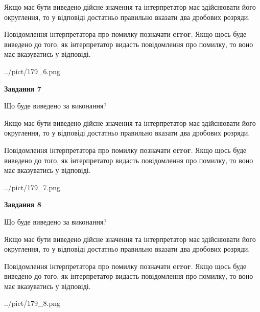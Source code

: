 \documentclass[12pt, ukrainian]{article}
\begin{document}
{\begin {Large}
Якщо має бути виведено дійсне значення та інтерпретатор має здійснювати його округлення, 
то у відповіді достатньо правильно вказати два дробових розряди.

Повідомлення інтерпретатора про помилку позначати \textbf{error}.
Якщо щось буде виведено до того, як інтерпретатор видасть повідомлення про помилку, 
то воно має вказуватись у відповіді. \par

\begin{center}
	{../pict/179_6.png}
\end{center}
\newpage

{\begin {center}\textbf{Завдання 7}\end {center}}\par
Що буде виведено за виконання? \par

Якщо має бути виведено дійсне значення та інтерпретатор має здійснювати його округлення, 
то у відповіді достатньо правильно вказати два дробових розряди.

Повідомлення інтерпретатора про помилку позначати \textbf{error}.
Якщо щось буде виведено до того, як інтерпретатор видасть повідомлення про помилку, 
то воно має вказуватись у відповіді. \par

\begin{center}
	{../pict/179_7.png}
\end{center}
\newpage

{\begin {center}\textbf{Завдання 8}\end {center}}\par
Що буде виведено за виконання? \par

Якщо має бути виведено дійсне значення та інтерпретатор має здійснювати його округлення, 
то у відповіді достатньо правильно вказати два дробових розряди.

Повідомлення інтерпретатора про помилку позначати \textbf{error}.
Якщо щось буде виведено до того, як інтерпретатор видасть повідомлення про помилку, 
то воно має вказуватись у відповіді. \par

\begin{center}
	{../pict/179_8.png}
\end{center}
\newpage


\end{Large}}
\end{document}
